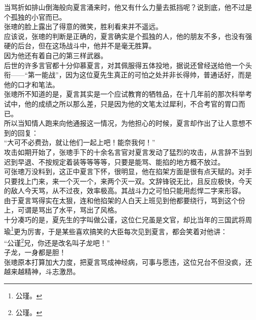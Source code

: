 \begin{multicols}{\theparacolNo}
当骂折如排山倒海般向夏言涌来时，他又有什么力量去抵挡呢？说到底，他不过是个孤独的小官而已。\\

张璁的脸上露出了得意的微笑，胜利看来并不遥远。\\

应该说，张璁的判断是正确的，夏言确实是个孤独的人，他的朋友不多，也没有强硬的后台，但在这场战斗中，他并不是毫无胜算。\\

因为他还有着自己的第三样武器。\\

后世的许多言官都十分仰慕夏言，对其佩服得五体投地，据说还曾经送给他一个头衔——“第一能战”，因为这位夏先生真正的可怕之处并非长得帅，普通话好，而是他的口才和笔法。\\

张璁所不知道的是，夏言其实是一个应试教育的牺牲品，在十几年前的那次科举考试中，他的成绩之所以那么差，只是因为他的文笔太过犀利，不合考官的胃口而已。\\

所以当知情人跑来向他通报这一情况，为他担心的时候，夏言却作出了让人意想不到的回复：\\

“大可不必费劲，就让他们一起上吧！能奈我何！”\\

攻击如期开始了，张璁手下的十余名言官对夏言发动了猛烈的攻击，从言辞不当到迟到早退、不按规定着装等等等等，只要是能骂、能掐的地方概不放过。\\

可张璁万没料到，这正中夏言下怀，很明显，他在掐架方面是很有点天赋的。对手只要找上门来，来一个灭一个，来两个灭一双。文辞锋锐无比，且反应极快，今天的敌人今天骂，从不过夜，效率极高。其战斗力之可怕只能用彪悍二字来形容。\\

由于夏言骂得实在太狠，连和他掐架的人白天上班见到他都要绕行，骂到这个份上，可谓是骂出了水平，骂出了风格。\\

十分凑巧的是，夏先生的字叫做公谨，这位仁兄虽是文官，却比当年的三国武将周瑜\footnote{公瑾。}更为厉害，于是某些喜欢搞笑的大臣每次见到夏言，都会笑着对他讲：\\

“公谨\footnote{公瑾。}兄，你还是改名叫子龙吧！”\\

子龙，一身都是胆！\\

张璁原本打算加大力度，把夏言骂成神经病，可事与愿违，这位兄台不但没疯，还越来越精神，斗志激昂。\\


\end{multicols}
